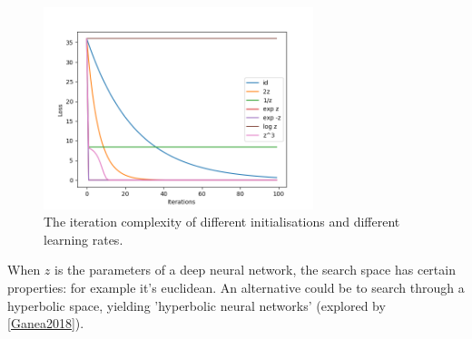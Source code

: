 \begin{figure}[h!]
\centering
\includegraphics[width=0.7\textwidth,height=0.35\textheight]{../../pictures/figures/reparam-mse-04.png}
\caption{The iteration complexity of different initialisations and different learning rates.}
\end{figure}

When $z$ is the parameters of a deep neural network, the search space has certain properties: for example it's euclidean.
An alternative could be to search through a hyperbolic space, yielding 'hyperbolic neural networks' (explored by \ref{Ganea2018}).
